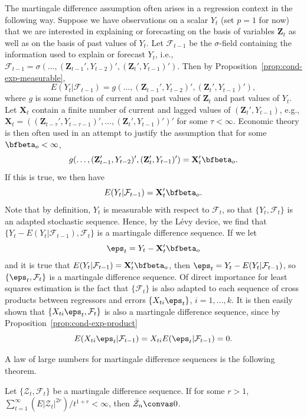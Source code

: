 The martingale difference assumption often arises in a regression context in the following way. Suppose we have observations on a scalar $Y_t$ (set $p = 1$ for now) that we are interested in explaining or forecasting on the basis of variables $\mathbf{Z}_t$ as well as on the basis of past values of $Y_t$. Let $\mathcal{F}_{t-1}$ be the $\sigma$-field containing the information used to explain or forecast $Y_t$, i.e., $\mathcal{F}_{t-1} = \sigma(\ldots, (\mathbf{Z}_{t-1}', Y_{t-2})', (\mathbf{Z}_t', Y_{t-1})')$. Then by Proposition~\ref{prop:cond-exp-measurable},
\[
E(Y_t | \mathcal{F}_{t-1}) = g(\ldots, (\mathbf{Z}_{t-1}', Y_{t-2})', (\mathbf{Z}_t', Y_{t-1})'),
\]
where $g$ is some function of current and past values of $\mathbf{Z}_t$ and past values of $Y_t$. Let $\mathbf{X}_t$ contain a finite number of current and lagged values of $(\mathbf{Z}_t', Y_{t-1})$, e.g., $\mathbf{X}_t = ((\mathbf{Z}_{t-\tau}', Y_{t-\tau-1})', \ldots, (\mathbf{Z}_t', Y_{t-1})')'$ for some $\tau < \infty$. Economic theory is then often used in an attempt to justify the assumption that for some $\bfbeta_o < \infty$,
\[
g(\ldots, (\mathbf{Z}_{t-1}', Y_{t-2})', (\mathbf{Z}_t', Y_{t-1})') = \mathbf{X}_t' \bfbeta_o.
\]
If this is true, we then have
\[
E(Y_t | \mathcal{F}_{t-1}) = \mathbf{X}_t' \bfbeta_o.
\]
Note that by definition, $Y_t$ is measurable with respect to $\mathcal{F}_t$, so that $\{Y_t, \mathcal{F}_t\}$ is an adapted stochastic sequence. Hence, by the L\'{e}vy device, we find that $\{Y_t - E(Y_t | \mathcal{F}_{t-1}), \mathcal{F}_t\}$ is a martingale difference sequence. If we let
\[
\eps_t = Y_t - \mathbf{X}_t' \bfbeta_o
\]
and it is true that $E(Y_t | \mathcal{F}_{t-1}) = \mathbf{X}_t' \bfbeta_o$, then $\eps_t = Y_t - E(Y_t | \mathcal{F}_{t-1})$, so $\{\eps_t, \mathcal{F}_t\}$ is a martingale difference sequence. Of direct importance for least squares estimation is the fact that $\{\mathcal{F}_t\}$ is also adapted to each sequence of cross products between regressors and errors $\{X_{ti} \eps_t\}$, $i = 1, \ldots, k$. It is then easily shown that $\{X_{ti} \eps_t, \mathcal{F}_t\}$ is also a martingale difference sequence, since by Proposition~\ref{prop:cond-exp-product}
\[
E(X_{ti} \eps_t | \mathcal{F}_{t-1}) = X_{ti} E(\eps_t | \mathcal{F}_{t-1}) = 0.
\]

A law of large numbers for martingale difference sequences is the following theorem.

\begin{theorem}[Chow]\label{thm:chow}
Let $\{\mathcal{Z}_t, \mathcal{F}_t\}$ be a martingale difference sequence. If for some $r > 1$, $\sum_{t=1}^{\infty} (E|\mathcal{Z}_t|^{2r})/t^{1+r} < \infty$, then $\bar{\mathcal{Z}}_n \convas 0$.
\end{theorem}

